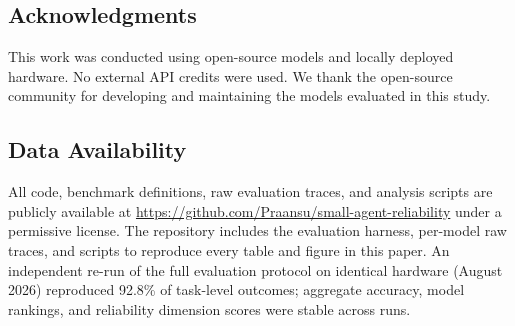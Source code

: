 \documentclass[11pt, twocolumn]{article}
\begin{document}
















\subsection*{Acknowledgments}
This work was conducted using open-source models and locally deployed hardware. No external API credits were used. We thank the open-source community for developing and maintaining the models evaluated in this study.

\subsection*{Data Availability}
All code, benchmark definitions, raw evaluation traces, and analysis scripts are publicly available at \url{https://github.com/Praansu/small-agent-reliability} under a permissive license. The repository includes the evaluation harness, per-model raw traces, and scripts to reproduce every table and figure in this paper. An independent re-run of the full evaluation protocol on identical hardware (August 2026) reproduced 92.8\% of task-level outcomes; aggregate accuracy, model rankings, and reliability dimension scores were stable across runs.

{
\small


}

\appendix

\end{document}
